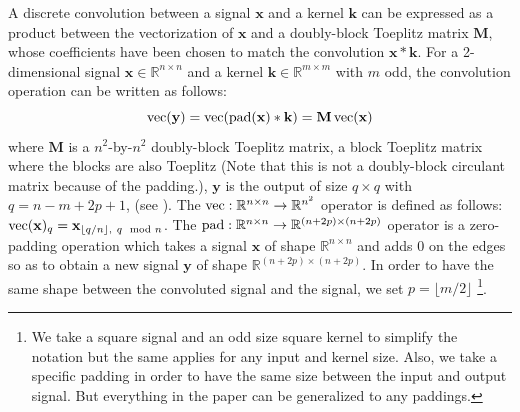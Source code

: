 A discrete convolution between a signal $\mathbf{x}$ and a kernel $\mathbf{k}$ can be expressed as a  product between the vectorization of $\mathbf{x}$ and a doubly-block Toeplitz matrix $\textbf{M}$, whose coefficients have been chosen to match the convolution $\mathbf{x} * \mathbf{k}$.
For a 2-dimensional signal $\mathbf{x} \in \mathbb{R}^{n \times n}$ and a kernel $\mathbf{k} \in \mathbb{R}^{m \times m}$ with $m$ odd, the convolution operation can be written as follows:
\begin{equation} \label{appendix-eq:equation_conv_as_matrix}
    \operatorname{vec}(\mathbf{y}) = \operatorname{vec}(\operatorname{pad}(\mathbf{x}) * \mathbf{k}) = \mathbf{M} \operatorname{vec}(\mathbf{x})
\end{equation}
where $\mathbf{M}$ is a $n^2$-by-$n^2$  doubly-block Toeplitz matrix, \ie a block Toeplitz matrix where the blocks are also Toeplitz (Note that this is not a doubly-block circulant matrix because of the padding.), $\mathbf{y}$ is the output of size $q \times q$ with $q = n - m + 2p + 1$, (see \eg \cite{dumoulin2016guide}).
The $\operatorname{vec}: \mathbb{R}^{n \times n} \rightarrow \mathbb{R}^{n^2}$ operator is defined as follows: $\operatorname{vec}(\mathbf{x})_q = \mathbf{x}_{\lfloor q/n \rfloor,\ q\mod n}$.
The $\operatorname{pad}: \mathbb{R}^{n \times n} \rightarrow \mathbb{R}^{(n+2p) \times (n+2p)}$ operator is a zero-padding operation which takes a signal $\mathbf{x}$ of shape $\mathbb{R}^{n \times n}$ and adds $0$ on the edges so as to obtain a new signal $\mathbf{y}$ of shape $\mathbb{R}^{(n+2p) \times (n+2p)}$.
In order to have the same shape between the convoluted signal and the signal, we set $ p = \lfloor m/2 \rfloor$ \footnote{We take a square signal and an odd size square kernel to simplify the notation but the same applies for any input and kernel size.
Also, we take a specific padding in order to have the same size between the input and output signal.
But everything in the paper can be generalized to any paddings.}.


